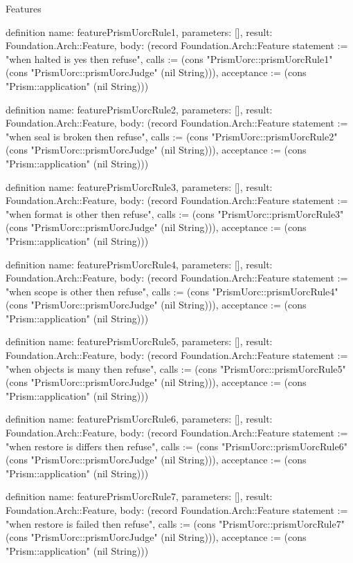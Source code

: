 \begin{lexlean}{Features}
\begin{semanticmodule}
definition{
  name: featurePrismUorcRule1,
  parameters: [],
  result: Foundation.Arch::Feature,
  body: (record Foundation.Arch::Feature {statement := "when halted is yes then refuse", calls := (cons "PrismUorc::prismUorcRule1" (cons "PrismUorc::prismUorcJudge" (nil String))), acceptance := (cons "Prism::application" (nil String))})
}

definition{
  name: featurePrismUorcRule2,
  parameters: [],
  result: Foundation.Arch::Feature,
  body: (record Foundation.Arch::Feature {statement := "when seal is broken then refuse", calls := (cons "PrismUorc::prismUorcRule2" (cons "PrismUorc::prismUorcJudge" (nil String))), acceptance := (cons "Prism::application" (nil String))})
}

definition{
  name: featurePrismUorcRule3,
  parameters: [],
  result: Foundation.Arch::Feature,
  body: (record Foundation.Arch::Feature {statement := "when format is other then refuse", calls := (cons "PrismUorc::prismUorcRule3" (cons "PrismUorc::prismUorcJudge" (nil String))), acceptance := (cons "Prism::application" (nil String))})
}

definition{
  name: featurePrismUorcRule4,
  parameters: [],
  result: Foundation.Arch::Feature,
  body: (record Foundation.Arch::Feature {statement := "when scope is other then refuse", calls := (cons "PrismUorc::prismUorcRule4" (cons "PrismUorc::prismUorcJudge" (nil String))), acceptance := (cons "Prism::application" (nil String))})
}

definition{
  name: featurePrismUorcRule5,
  parameters: [],
  result: Foundation.Arch::Feature,
  body: (record Foundation.Arch::Feature {statement := "when objects is many then refuse", calls := (cons "PrismUorc::prismUorcRule5" (cons "PrismUorc::prismUorcJudge" (nil String))), acceptance := (cons "Prism::application" (nil String))})
}

definition{
  name: featurePrismUorcRule6,
  parameters: [],
  result: Foundation.Arch::Feature,
  body: (record Foundation.Arch::Feature {statement := "when restore is differs then refuse", calls := (cons "PrismUorc::prismUorcRule6" (cons "PrismUorc::prismUorcJudge" (nil String))), acceptance := (cons "Prism::application" (nil String))})
}

definition{
  name: featurePrismUorcRule7,
  parameters: [],
  result: Foundation.Arch::Feature,
  body: (record Foundation.Arch::Feature {statement := "when restore is failed then refuse", calls := (cons "PrismUorc::prismUorcRule7" (cons "PrismUorc::prismUorcJudge" (nil String))), acceptance := (cons "Prism::application" (nil String))})
}


\end{semanticmodule}
\end{lexlean}
